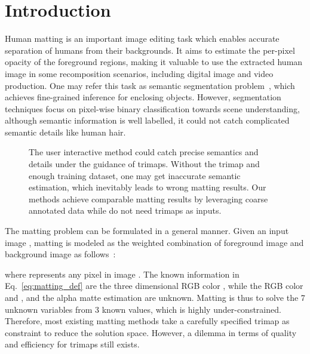 \documentclass[10pt,twocolumn,letterpaper]{article}
\begin{document}
\section{Introduction}

Human matting is an important image editing task which enables accurate separation of humans from their backgrounds. It aims to estimate the per-pixel opacity of the foreground regions, making it valuable to use the extracted human image in some recomposition scenarios, including digital image and video production. One may refer this task as semantic segmentation problem~\cite{badrinarayanan2017segnet,chen2017rethinking,long2015fully}, which achieves fine-grained inference for enclosing objects. However, segmentation techniques focus on pixel-wise binary classification towards scene understanding, although semantic information is well labelled, it could not catch complicated semantic details like human hair.

\begin{figure}[t]
  \centering
  \caption{The user interactive method could catch precise semantics and details under the guidance of trimaps. Without the trimap and enough training dataset, one may get inaccurate semantic estimation, which inevitably leads to wrong matting results. Our methods achieve comparable matting results by leveraging coarse annotated data while do not need trimaps as inputs.}
  \label{fig: motivation}
\end{figure}

The matting problem can be formulated in a general manner. Given an input image , matting is modeled as the weighted combination of foreground image  and background image  as follows~\cite{wang2008image}:

where  represents any pixel in image . The known information in Eq.~\ref{eq:matting_def} are the three dimensional RGB color , while the RGB color  and , and the alpha matte estimation  are unknown. Matting is thus to solve the 7 unknown variables from 3 known values, which is highly under-constrained. Therefore, most existing matting methods take a carefully specified trimap as constraint to reduce the solution space. However, a dilemma in terms of quality and efficiency for trimaps still exists.
\end{document}
